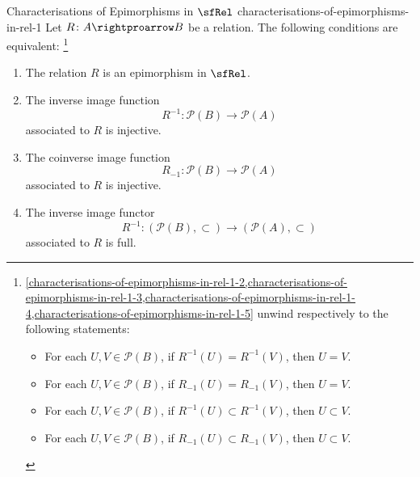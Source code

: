 \begin{proposition}{Characterisations of Epimorphisms in $\sfRel$ \rmI}{characterisations-of-epimorphisms-in-rel-1}%
    Let $R\colon A\rightproarrow B$ be a relation. The following conditions are equivalent:%
    \footnote{%
        \cref{characterisations-of-epimorphisms-in-rel-1-2,characterisations-of-epimorphisms-in-rel-1-3,characterisations-of-epimorphisms-in-rel-1-4,characterisations-of-epimorphisms-in-rel-1-5} unwind respectively to the following statements:
        \begin{itemize}
            \item For each $U,V\in\mathcal{P}(B)$, if $R^{-1}(U)=R^{-1}(V)$,        then $U=V$.%
            \item For each $U,V\in\mathcal{P}(B)$, if $R_{-1}(U)=R_{-1}(V)$,        then $U=V$.
            \item For each $U,V\in\mathcal{P}(B)$, if $R^{-1}(U)\subset R^{-1}(V)$, then $U\subset V$.
            \item For each $U,V\in\mathcal{P}(B)$, if $R_{-1}(U)\subset R_{-1}(V)$, then $U\subset V$.
        \end{itemize}
        \par\vspace*{\TCBBoxCorrection}
    }%
    \begin{enumerate}
        \item\label{characterisations-of-epimorphisms-in-rel-1-1}The relation $R$ is an epimorphism in $\sfRel$.
        \item\label{characterisations-of-epimorphisms-in-rel-1-2}The inverse image function%
            \[
                R^{-1}%
                \colon%
                \mathcal{P}(B)%
                \to%
                \mathcal{P}(A)%
            \]%
            associated to $R$ is injective.
        \item\label{characterisations-of-epimorphisms-in-rel-1-3}The coinverse image function
            \[
                R_{-1}%
                \colon%
                \mathcal{P}(B)%
                \to%
                \mathcal{P}(A)%
            \]%
            associated to $R$ is injective.
        \item\label{characterisations-of-epimorphisms-in-rel-1-4}The inverse image functor
            \[
                R^{-1}%
                \colon%
                (\mathcal{P}(B),\subset)%
                \to%
                (\mathcal{P}(A),\subset)%
            \]%
            associated to $R$ is full.

\end{enumerate}
\end{proposition}
